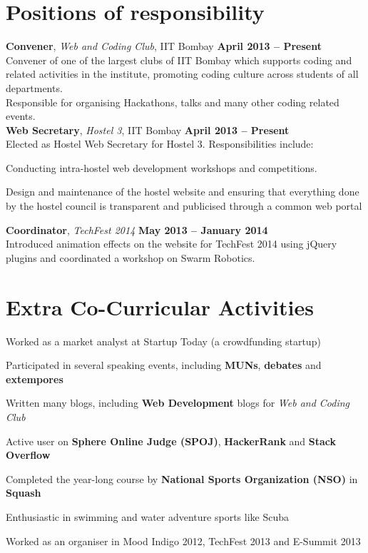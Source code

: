 \documentclass[margin,11pt]{resume}
\begin{document}
\begin{resume}
\section{\mysidestyle Positions of responsibility}
\textbf{Convener}, \textsl{Web and Coding Club}, IIT Bombay \hfill \textbf{April 2013 -- Present}\\
Convener of one of the largest clubs of IIT Bombay which supports coding and related activities in the institute, promoting coding culture across students of all departments. \\ Responsible for organising Hackathons, talks and many other coding related events.
\vspace{2mm}\\
\textbf{Web Secretary}, \textsl{Hostel 3}, IIT Bombay \hfill \textbf{April 2013 -- Present}\\
Elected as Hostel Web Secretary for Hostel 3. Responsibilities include:
\begin{list2}
\item Conducting intra-hostel web development workshops and competitions.
\item Design and maintenance of the hostel website and ensuring that everything done by the hostel council is transparent and publicised through a common web portal
\end{list2}
\vspace{-3mm}
\textbf{Coordinator}, \textsl{TechFest 2014} \hfill \textbf{May 2013 -- January 2014}\\
Introduced animation effects on the website for TechFest 2014 using jQuery plugins and
coordinated a workshop on Swarm Robotics.


\section{\mysidestyle Extra Co-Curricular Activities}
\begin{list2}
\item Worked as a market analyst at Startup Today (a crowdfunding startup)
\item Participated in several speaking events, including \textbf{MUNs}, \textbf{debates} and \textbf{extempores}
\item Written many blogs, including \textbf{Web Development} blogs for \textsl{Web and Coding Club}
\item Active user on \textbf{Sphere Online Judge (SPOJ)}, \textbf{HackerRank} and \textbf{Stack Overflow}
\item Completed the year-long course by \textbf{National Sports Organization (NSO)} in \textbf{Squash}
\item Enthusiastic in swimming and water adventure sports like Scuba
\item Worked as an organiser in Mood Indigo 2012, TechFest 2013 and E-Summit 2013
\end{list2}




\end{resume}
\end{document}
